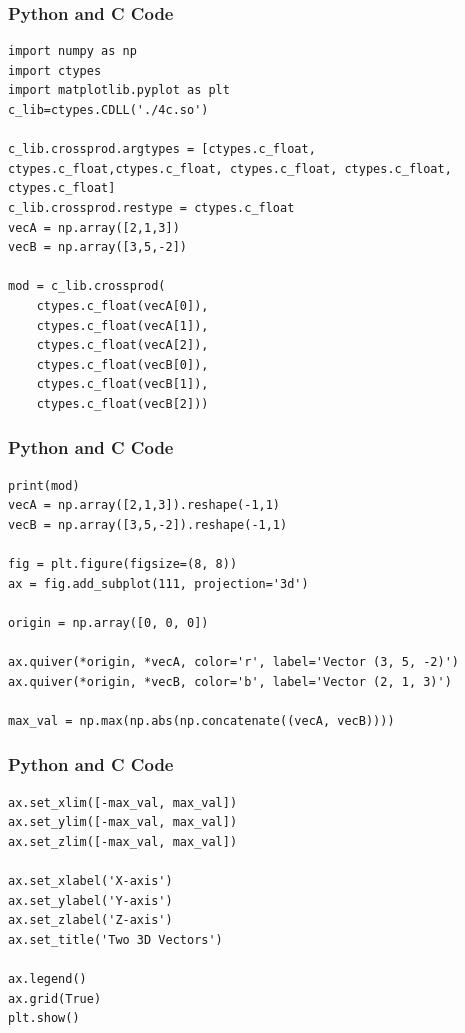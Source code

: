 \documentclass{beamer}
\begin{document}
\begin{frame}[fragile]
\frametitle{Python and C Code}

\begin{lstlisting}
import numpy as np
import ctypes
import matplotlib.pyplot as plt
c_lib=ctypes.CDLL('./4c.so')

c_lib.crossprod.argtypes = [ctypes.c_float, ctypes.c_float,ctypes.c_float, ctypes.c_float, ctypes.c_float, ctypes.c_float]
c_lib.crossprod.restype = ctypes.c_float
vecA = np.array([2,1,3])
vecB = np.array([3,5,-2])

mod = c_lib.crossprod(
    ctypes.c_float(vecA[0]),
    ctypes.c_float(vecA[1]), 
    ctypes.c_float(vecA[2]),
    ctypes.c_float(vecB[0]), 
    ctypes.c_float(vecB[1]),
    ctypes.c_float(vecB[2]))
\end{lstlisting}

\end{frame}

\begin{frame}[fragile]
\frametitle{Python and C Code}
\begin{lstlisting}
print(mod)
vecA = np.array([2,1,3]).reshape(-1,1)
vecB = np.array([3,5,-2]).reshape(-1,1)

fig = plt.figure(figsize=(8, 8))
ax = fig.add_subplot(111, projection='3d')

origin = np.array([0, 0, 0])

ax.quiver(*origin, *vecA, color='r', label='Vector (3, 5, -2)')
ax.quiver(*origin, *vecB, color='b', label='Vector (2, 1, 3)')

max_val = np.max(np.abs(np.concatenate((vecA, vecB))))
\end{lstlisting}

\end{frame}

\begin{frame}[fragile]
\frametitle{Python and C Code}

\begin{lstlisting}
ax.set_xlim([-max_val, max_val])
ax.set_ylim([-max_val, max_val])
ax.set_zlim([-max_val, max_val])

ax.set_xlabel('X-axis')
ax.set_ylabel('Y-axis')
ax.set_zlabel('Z-axis')
ax.set_title('Two 3D Vectors')

ax.legend()
ax.grid(True)
plt.show()
\end{lstlisting}

\end{frame}
\end{document}
